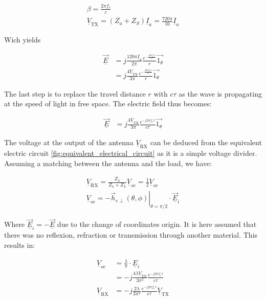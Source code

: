 \documentclass[10pt,a4paper]{ULBreport}
\begin{document}
\begin{gather*}
    \beta = \frac{2\pi f_c}{c}\\
    \underline{V}_{\text{TX}} = (Z_a + Z_S) \underline{I}_a = \frac{720\pi}{16} \underline{I}_a
\end{gather*}

Wich yields

\begin{align*}
    \underline{\vec{E}} &= j \frac{120\pi\underline{I}_a}{2\pi} \frac{e^{-\frac{j2\pi f_c r}{c}}}{r} \vec{1_{\theta}}\\
    &= j \frac{4\underline{V}_{\text{TX}}}{3\pi} \frac{e^{-\frac{j2\pi f_c r}{c}}}{r} \vec{1_{\theta}}
\end{align*}

The last step is to replace the travel distance $r$ with $c \tau$ as the wave is propagating at the speed of light in free space. The electric field thus becomes:

\begin{align*}
    \underline{\vec{E}} &= j \frac{4 \underline{V}_{\text{TX}}}{3\pi} \frac{e^{-j2\pi f_c \tau}}{c\tau} \vec{1_{\theta}}
\end{align*}

The voltage at the output of the antenna $\underline{V}_{\text{RX}}$ can be deduced from the equivalent electric circuit \ref{fig:equivalent_electrical_circuit} as it is a simple voltage divider. Assuming a matching between the antenna and the load, we have:

\begin{align*}
    \underline{V}_{\text{RX}} = \frac{Z_L}{Z_a + Z_L} \underline{V}_{oc} = \frac{1}{2} \underline{V}_{oc}\\
    \underline{V}_{oc} = -\left . \vec{h}_{e\perp}(\theta, \phi)\right\vert_{\theta = \pi/2} \cdot \underline{\vec{E}}_i
\end{align*}

Where $\underline{\vec{E}}_i = - \underline{\vec{E}}$ due to the change of coordinates origin. It is here assumed that there was no reflexion, refraction or transmission through another material. This results in:

\begin{align*}
    \underline{V}_{oc} &= \frac{\lambda}{\pi} \cdot \underline{E}_i\\
    &= -j\frac{4  \lambda \underline{V}_{\text{TX}}}{3\pi^2}\frac{e^{-j 2\pi f_c \tau}}{c\tau}\\
    \underline{V}_{\text{RX}} &= -j\frac{2  \lambda }{3\pi^2}\frac{e^{-j 2\pi f_c \tau}}{c\tau}\underline{V}_{\text{TX}}
\end{align*}
\end{document}
